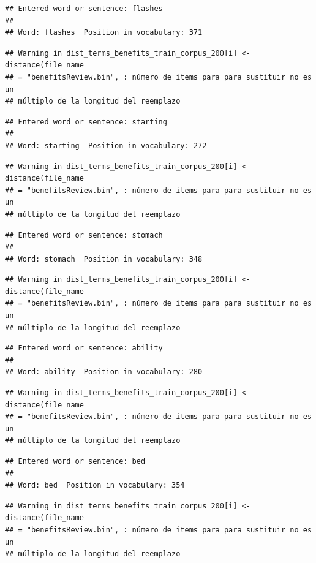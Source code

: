 \documentclass[spanish,]{article}
\begin{document}
\begin{verbatim}
## Entered word or sentence: flashes
## 
## Word: flashes  Position in vocabulary: 371
\end{verbatim}

\begin{verbatim}
## Warning in dist_terms_benefits_train_corpus_200[i] <- distance(file_name
## = "benefitsReview.bin", : número de items para para sustituir no es un
## múltiplo de la longitud del reemplazo
\end{verbatim}

\begin{verbatim}
## Entered word or sentence: starting
## 
## Word: starting  Position in vocabulary: 272
\end{verbatim}

\begin{verbatim}
## Warning in dist_terms_benefits_train_corpus_200[i] <- distance(file_name
## = "benefitsReview.bin", : número de items para para sustituir no es un
## múltiplo de la longitud del reemplazo
\end{verbatim}

\begin{verbatim}
## Entered word or sentence: stomach
## 
## Word: stomach  Position in vocabulary: 348
\end{verbatim}

\begin{verbatim}
## Warning in dist_terms_benefits_train_corpus_200[i] <- distance(file_name
## = "benefitsReview.bin", : número de items para para sustituir no es un
## múltiplo de la longitud del reemplazo
\end{verbatim}

\begin{verbatim}
## Entered word or sentence: ability
## 
## Word: ability  Position in vocabulary: 280
\end{verbatim}

\begin{verbatim}
## Warning in dist_terms_benefits_train_corpus_200[i] <- distance(file_name
## = "benefitsReview.bin", : número de items para para sustituir no es un
## múltiplo de la longitud del reemplazo
\end{verbatim}

\begin{verbatim}
## Entered word or sentence: bed
## 
## Word: bed  Position in vocabulary: 354
\end{verbatim}

\begin{verbatim}
## Warning in dist_terms_benefits_train_corpus_200[i] <- distance(file_name
## = "benefitsReview.bin", : número de items para para sustituir no es un
## múltiplo de la longitud del reemplazo
\end{verbatim}
\end{document}

